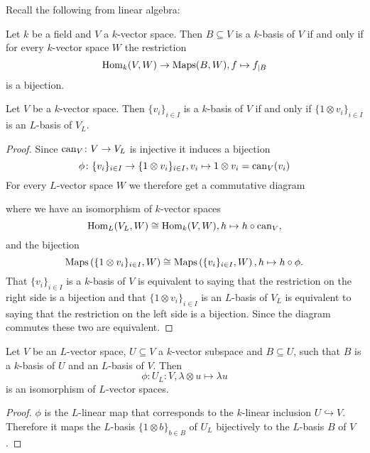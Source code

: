 Recall the following from linear algebra:


\begin{rec}
 Let $k$ be a field and $V$ a $k$-vector space. Then $B \subseteq V$ is a $k$-basis of $V$ if and only if for every $k$-vector space $W$ the restriction
 \[
  \operatorname{Hom}_k(V,W) \to \operatorname{Maps}(B,W), f \mapsto f_{|B}
 \]
 is a bijection.
\end{rec}


\begin{lem}
 Let $V$ be a $k$-vector space. Then $\{v_i\}_{i \in I}$ is a $k$-basis of $V$ if and only if $\{1 \otimes v_i\}_{i \in I}$ is an $L$-basis of $V_L$.
\end{lem}
\begin{proof}
 Since $\operatorname{can}_V \colon V \to V_L$ is injective it induces a bijection
 \[
  \phi \colon \{v_i\}_{i \in I} \to \{1 \otimes v_i\}_{i \in I}, v_i \mapsto 1 \otimes v_i = \operatorname{can}_V(v_i)
 \]
 For every $L$-vector space $W$ we therefore get a commutative diagram
 \begin{center}
 \end{center}
 where we have an isomorphism of $k$-vector spaces
 \[
  \operatorname{Hom}_L(V_L, W) \cong \operatorname{Hom}_k(V, W), h \mapsto h \circ \operatorname{can}_V,
 \]
 and the bijection
 \[
  \operatorname{Maps}\left( \{1 \otimes v_i\}_{i \in I}, W\right ) \cong \operatorname{Maps}\left( \{v_i\}_{i \in I} ,W\right ), h \mapsto h \circ \phi.
 \]
 That $\{v_i\}_{i \in I}$ is a $k$-basis of $V$ is equivalent to saying that the restriction on the right side is a bijection and that $\{1 \otimes v_i\}_{i \in I}$ is an $L$-basis of $V_L$ is equivalent to saying that the restriction on the left side is a bijection. Since the diagram commutes these two are equivalent.
\end{proof}


\begin{cor}\label{cor: inclusion to bijection vector spaces}
 Let $V$ be an $L$-vector space, $U \subseteq V$ a $k$-vector subspace and $B \subseteq U$, such that $B$ is a $k$-basis of $U$ and an $L$-basis of $V$. Then
 \[
  \phi \colon U_L \colon V, \lambda \otimes u \mapsto \lambda u
 \]
 is an isomorphism of $L$-vector spaces.
\end{cor}
\begin{proof}
 $\phi$ is the $L$-linear map that corresponds to the $k$-linear inclusion $U \hookrightarrow V$. Therefore it maps the $L$-basis $\{1 \otimes b\}_{b \in B}$ of $U_L$ bijectively to the $L$-basis $B$ of $V$.
\end{proof}


